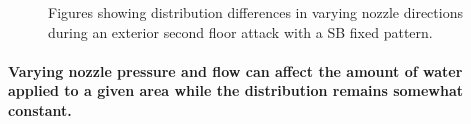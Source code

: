 \documentclass{article}
\begin{document}
\begin{figure}[ht]
\begin{tabular*}{\textwidth}{lr}
\end{tabular*}
\caption{Figures showing distribution differences in varying nozzle directions during an exterior second floor attack with a SB fixed pattern.}
\label{fig:Exterior_Second_Floor_Varying_Nozzle_Directions_SB_Fixed_Pattern}
\end{figure}

\clearpage

\paragraph{Varying nozzle pressure and flow can affect the amount of water applied to a given area while the distribution remains somewhat constant.} \mbox{}


\end{document}
